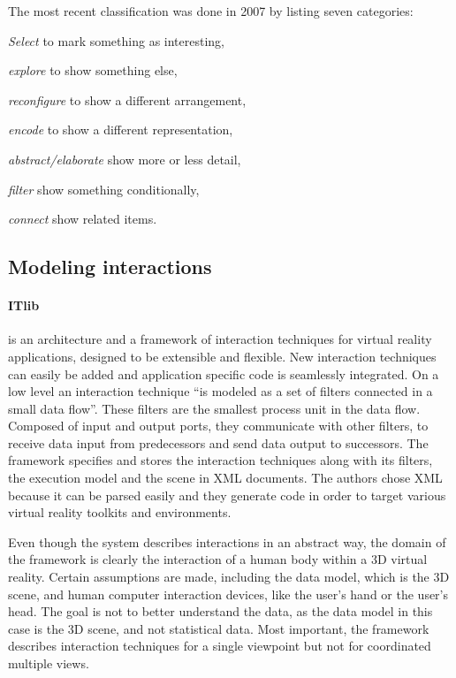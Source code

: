 \documentclass{article}
\begin{document}
The most recent classification was done in 2007 by \textcite{Yi2007} listing seven categories:
\begin{enumerate*}[label=(\arabic*)]
  \item
    \emph{Select} to mark something as interesting,
  \item
    \emph{explore} to show something else,
  \item
    \emph{reconfigure} to show a different arrangement,
  \item
    \emph{encode} to show a different representation,
  \item
    \emph{abstract/elaborate} show more or less detail,
  \item
    \emph{filter} show something conditionally,
  \item
    \emph{connect} show related items.
\end{enumerate*}


\subsection{Modeling interactions}
\paragraph{ITlib\cite{Figueroa2001}} is an architecture and a framework of interaction techniques for virtual reality applications, designed to be extensible and flexible.
New interaction techniques can easily be added and application specific code is seamlessly integrated.
On a low level an interaction technique ``is modeled as a set of filters connected in a small data flow''\cite[Basic concept, p.~2]{Figueroa2001}.
These filters are the smallest process unit in the data flow.
Composed of input and output ports, they communicate with other filters, to receive data input from predecessors and send data output to successors.
The framework specifies and stores the interaction techniques along with its filters, the execution model and the scene in XML documents.
The authors chose XML because it can be parsed easily and they generate code in order to target various virtual reality toolkits and environments.

Even though the system describes interactions in an abstract way, the domain of the framework is clearly the interaction of a human body within a 3D virtual reality.
Certain assumptions are made, including the data model, which is the 3D scene, and human computer interaction devices, like the user's hand or the user's head.
The goal is not to better understand the data, as the data model in this case is the 3D scene, and not statistical data.
Most important, the framework describes interaction techniques for a single viewpoint but not for coordinated multiple views.
\end{document}
